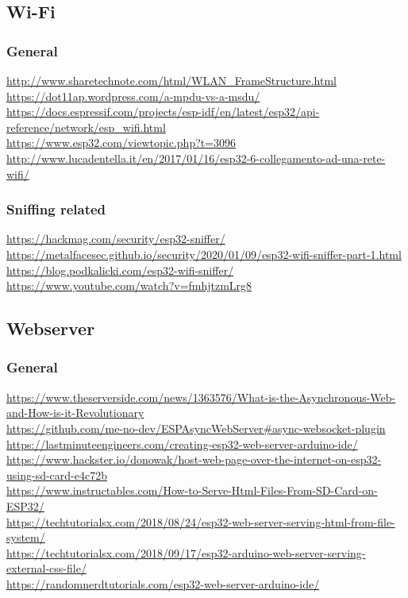 \documentclass[11pt,a4paper]{article}
\begin{document}
\subsection{Wi-Fi}

\subsubsection{General}

\url{http://www.sharetechnote.com/html/WLAN_FrameStructure.html}\\[4pt]
\url{https://dot11ap.wordpress.com/a-mpdu-vs-a-msdu/}\\[4pt]
\url{https://docs.espressif.com/projects/esp-idf/en/latest/esp32/api-reference/network/esp_wifi.html}\\[4pt]
\url{https://www.esp32.com/viewtopic.php?t=3096}\\[4pt]
\url{http://www.lucadentella.it/en/2017/01/16/esp32-6-collegamento-ad-una-rete-wifi/}

\subsubsection{Sniffing related}

\url{https://hackmag.com/security/esp32-sniffer/}\\[4pt]
\url{https://metalfacesec.github.io/security/2020/01/09/esp32-wifi-sniffer-part-1.html}\\[4pt]
\url{https://blog.podkalicki.com/esp32-wifi-sniffer/}\\[4pt]
\url{https://www.youtube.com/watch?v=fmhjtzmLrg8}


\subsection{Webserver}


\subsubsection{General}

\url{https://www.theserverside.com/news/1363576/What-is-the-Asynchronous-Web-and-How-is-it-Revolutionary}\\[4pt]
\url{https://github.com/me-no-dev/ESPAsyncWebServer#async-websocket-plugin}\\[4pt]
\url{https://lastminuteengineers.com/creating-esp32-web-server-arduino-ide/}\\[4pt]
\url{https://www.hackster.io/donowak/host-web-page-over-the-internet-on-esp32-using-sd-card-e4c72b}\\[4pt]
\url{https://www.instructables.com/How-to-Serve-Html-Files-From-SD-Card-on-ESP32/}\\[4pt]
\url{https://techtutorialsx.com/2018/08/24/esp32-web-server-serving-html-from-file-system/}\\[4pt]
\url{https://techtutorialsx.com/2018/09/17/esp32-arduino-web-server-serving-external-css-file/}\\[4pt]
\url{https://randomnerdtutorials.com/esp32-web-server-arduino-ide/}
\end{document}

